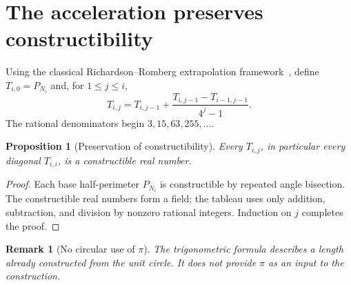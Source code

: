 \documentclass[11pt]{article}
\newtheorem{proposition}{Proposition}
\newtheorem{remark}{Remark}
\begin{document}
\section{The acceleration preserves constructibility}
Using the classical Richardson--Romberg extrapolation framework~\cite{richardson,romberg}, define $T_{i,0}=P_{N_i}$ and, for $1\le j\le i$,
\[
T_{i,j}=T_{i,j-1}+\frac{T_{i,j-1}-T_{i-1,j-1}}{4^j-1}.
\]
The rational denominators begin $3,15,63,255,\ldots$.
\begin{proposition}[Preservation of constructibility]
Every $T_{i,j}$, in particular every diagonal $T_{i,i}$, is a constructible real number.
\end{proposition}
\begin{proof}
Each base half-perimeter $P_{N_i}$ is constructible by repeated angle bisection. The constructible real numbers form a field; the tableau uses only addition, subtraction, and division by nonzero rational integers. Induction on $j$ completes the proof.
\end{proof}
\begin{remark}[No circular use of $\pi$]
The trigonometric formula describes a length already constructed from the unit circle. It does not provide $\pi$ as an input to the construction.
\end{remark}
\end{document}
